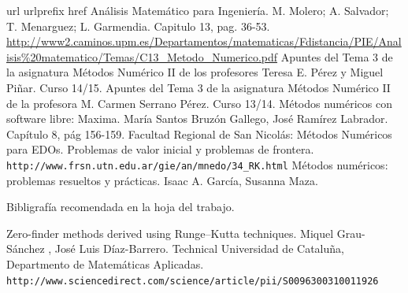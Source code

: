 \documentclass[paper=a4, fontsize=11pt]{scrartcl} %
\numberwithin{equation}{section}
\begin{document}
\begin{thebibliography}{10}
\expandafter\ifx\csname url\endcsname\relax
  \def\url#1{\texttt{#1}}\fi
\expandafter\ifx\csname urlprefix\endcsname\relax\def\urlprefix{URL }\fi
\expandafter\ifx\csname href\endcsname\relax
  \def\href#1#2{#2} \def\path#1{#1}\fi
{}
Análisis Matemático para Ingeniería. M. Molero; A. Salvador; T. Menarguez; L. Garmendia. Capitulo 13, pag. 36-53.\\
\url{http://www2.caminos.upm.es/Departamentos/matematicas/Fdistancia/PIE/Analisis%20matematico/Temas/C13_Metodo_Numerico.pdf}
Apuntes del Tema 3 de la asignatura Métodos Numérico II de los profesores Teresa E. Pérez y Miguel Piñar. Curso 14/15.
Apuntes del Tema 3 de la asignatura Métodos Numérico II de la profesora M. Carmen Serrano Pérez. Curso 13/14.
Métodos numéricos con software libre: Maxima. María Santos Bruzón Gallego, José Ramírez Labrador. Capítulo 8, pág 156-159.
Facultad Regional de San Nicolás: Métodos Numéricos para EDOs. Problemas de valor inicial y problemas de frontera.\\
\url{http://www.frsn.utn.edu.ar/gie/an/mnedo/34_RK.html}
Métodos numéricos: problemas resueltos y prácticas. Isaac A. García, Susanna Maza.

Bibligrafía recomendada en la hoja del trabajo.

Zero-finder methods derived using Runge–Kutta techniques. Miquel Grau-Sánchez , José Luis Díaz-Barrero. Technical Universidad de Cataluña, Departmento de Matemáticas Aplicadas.\\
\url{http://www.sciencedirect.com/science/article/pii/S0096300310011926}

\end{thebibliography}
\end{document}

